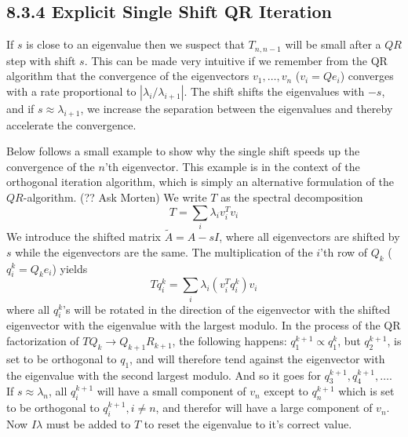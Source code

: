 
\subsection*{8.3.4 Explicit Single Shift QR Iteration}%

If $s$ is close to an eigenvalue then we suspect that $T_{n,n-1}$ will be small after a $QR$ step
with shift $s$. This can be made very intuitive if we remember from the QR algorithm 
that the convergence of the eigenvectors $v_1,\dots,v_n$ ($v_i=Qe_i$) converges with a rate 
proportional to $|\lambda_i/\lambda_{i+1}|$.
The shift shifts the eigenvalues with $-s$, and if 
$s\approx\lambda_{i+1}$, we increase the separation 
between the eigenvalues and thereby accelerate the convergence. 

Below follows a small example to show why the single shift 
speeds up the convergence of the $n$'th eigenvector.
This example is in the context of the orthogonal iteration algorithm, which is simply an
alternative formulation of the $QR$-algorithm. (?? Ask Morten)
We write $T$ as the spectral decomposition
\begin{equation}
	T = \sum_i \lambda_i v_i^Tv_i
\end{equation}
We introduce the shifted matrix $\tilde A = A - sI$, where all eigenvectors are shifted by $s$ while
the eigenvectors are the same. 
The multiplication of the $i$'th row of $Q_k$ ($q^{k}_i=Q_ke_i$) yields
\begin{equation}
	Tq^k_i = \sum_i \lambda_i (v_i^Tq^k_i) v_i
\end{equation}
where all $q^k_i$'s will be rotated in the direction of the eigenvector with the shifted 
eigenvector with the eigenvalue with the largest modulo. 
In the process of the QR factorization of $TQ_k\to Q_{k+1}R_{k+1}$, the following happens:
$q^{k+1}_1\propto q^k_1$, but
$q^{k+1}_2$, is set to be orthogonal to $q_1$, and will therefore tend against the eigenvector 
with the eigenvalue with the second largest modulo. And so it goes for $q^{k+1}_3,q^{k+1}_4,\dots$.
If $s\approx\lambda_n$, all $q^{k+1}_i$ will have a small component of $v_n$ except to $q^{k+1}_n$
which is set to be orthogonal to $q^{k+1}_i,i\neq n$, and therefor will have a large component 
of $v_n$. Now $I\lambda$ must be added to $T$ to reset the eigenvalue to it's correct value.

